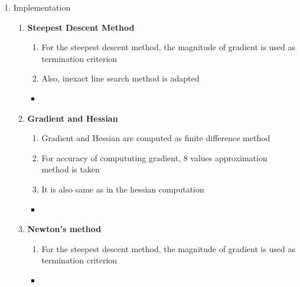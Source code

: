 \documentclass{standalone}
\begin{document}
\begin{enumerate}
    \item Implementation
      \begin{enumerate}
        \item \textbf{Steepest Descent Method}
        \begin{enumerate}
          \item For the steepest descent method, the magnitude of gradient is used as termination criterion
          \item Also, inexact line search method is adapted
        \end{enumerate}
    
        \begin{itemize}[label=\quad,leftmargin=-5em]
          \item {}
        \end{itemize}
    
        \newpage %
        \item \textbf{Gradient and Hessian}
        \begin{enumerate}
            \item Gradient and Hessian are computed as finite difference method
            \item For accuracy of compututing gradient, 8 values approximation method is taken
            \item It is also same as in the hessian computation 
          \end{enumerate}
      
          \begin{itemize}[label=\quad,leftmargin=-5em]
            \item {}
          \end{itemize}

        \newpage %
        \item \textbf{Newton's method}
        \begin{enumerate}
          \item For the steepest descent method, the magnitude of gradient is used as termination criterion
        \end{enumerate}
        \begin{itemize}[label=\quad,leftmargin=-5em]
          \item {}
        \end{itemize}
    

\end{enumerate}
\end{enumerate}
\end{document}
